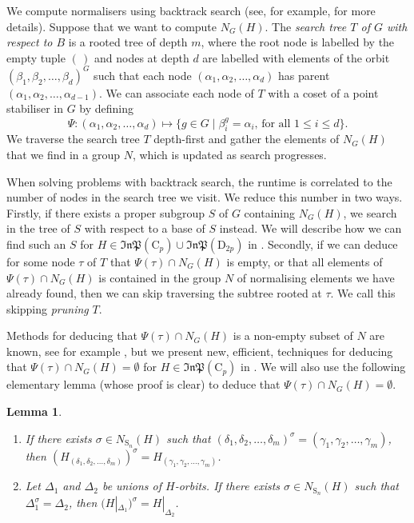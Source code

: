 \documentclass[11pt,a4paper]{article}
\newtheorem{lemma}[theorem]{Lemma}
\theoremstyle{definition}
\theoremstyle{remark}
\newcommand{\lists}[3]{ {#1}_1 {#2} {#1}_2 {#2} \ldots {#2} {#1}_{#3}  }
\newcommand{\InP}{\mathfrak{InP}}
\newcommand{\Sy}{\mathrm{S}}
\newcommand{\Cy}{\mathrm{C}}
\newcommand{\Di}{\mathrm{D}}
\begin{document}
We compute normalisers using backtrack search (see, for example, \cite{handbookCGT, seress} for more details).
Suppose that we want to compute $N_{G}(H)$.
The \emph{search tree $T$ of $G$ with respect to $B$} is a rooted tree of depth $m$, where the root node is labelled by the empty tuple $( \, )$ 
and nodes at depth $d$ are labelled with elements of the orbit $(\lists{\beta}{,}{d})^G$ such that each node $(\lists{\alpha}{,}{d})$ has parent $(\lists{\alpha}{,}{d-1})$. 
We can associate each node of $T$ with a coset of a point stabiliser in $G$ by defining
\[\Psi : \left( \lists{\alpha}{,}{d} \right) \mapsto \{ g \in G \mid \beta_i^g = \alpha_i,  \, \text{for all } 1 \leq i \leq d \}.\]
We traverse the search tree $T$ depth-first and gather the elements of $N_G(H)$ that we find in a group $N$, which is updated as search progresses. 

When solving problems with backtrack search, the runtime is correlated to the number of nodes in the search tree we visit. We reduce this number in two ways. 
Firstly, if there exists a proper subgroup $S$ of $G$ containing $N_G(H)$, we search in the tree of $S$ with respect to a base of $S$ instead.
We will describe how we can find such an $S$ for $H \in \InP(\Cy_p) \cup \InP(\Di_{2p})$ in . 
Secondly, if we can deduce for some node $\tau$ of $T$ that $\Psi(\tau) \cap N_G(H)$ is empty, or that all elements of $\Psi(\tau)\cap N_G(H)$ is contained in the group $N$ of normalising elements we have already found, then we can skip traversing the subtree rooted at $\tau$. We call this skipping \emph{pruning} $T$. 

Methods for deducing that $\Psi(\tau) \cap N_G(H)$ is a non-empty subset of $N$ are known, see for example \cite[Section~9.1]{seress}, but we present new, efficient, techniques for deducing that $\Psi(\tau) \cap N_G(H) = \emptyset$ for $H \in \InP(\Cy_p)$ in . 
We will also use the following elementary lemma (whose proof is clear) to deduce that $\Psi(\tau) \cap N_G(H) = \emptyset$. 

\begin{lemma} \label{prune by stabs or projections}
\begin{enumerate}
    \item \label{stabToStab} If there exists $\sigma \in N_{\Sy_n}(H)$ such that $(\lists{\delta}{,}{m})^\sigma = (\lists{\gamma}{,}{m})$, then ${(H_{(\lists{\delta}{,}{m})})}^\sigma = H_{(\lists{\gamma}{,}{m})}$. 
    \item \label{norm orbs to orbs with same projection} Let $\Delta_1$ and $\Delta_2$ be unions of $H$-orbits. 
If there exists $\sigma \in N_{\Sy_{n}}(H)$ such that $\Delta_1^\sigma = \Delta_2$, then $(H|_{\Delta_1})^\sigma = H|_{\Delta_2}$.
\end{enumerate}
\end{lemma}
\end{document}
